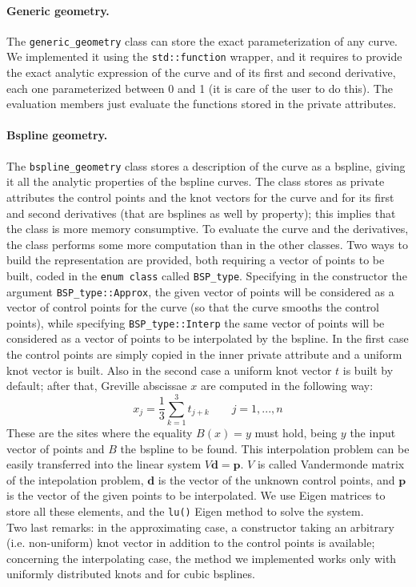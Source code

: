 \documentclass[10pt]{article} %
\newcommand{\classname}[1]{\texttt{#1}}
\begin{document}
	\paragraph{Generic geometry.} The \classname{generic\_geometry} class can store the exact parameterization of any curve. We implemented it using the \texttt{std::function} wrapper, and it requires to provide the exact analytic expression of the curve and of its first and second derivative, each one parameterized between 0 and 1 (it is care of the user to do this). The evaluation members just evaluate the functions stored in the private attributes.
	\paragraph{Bspline geometry.} The \classname{bspline\_geometry} class stores a description of the curve as a bspline, giving it all the analytic properties of the bspline curves. The class stores as private attributes the control points and the knot vectors for the curve and for its first and second derivatives (that are bsplines as well by property); this implies that the class is more memory consumptive. To evaluate the curve and the derivatives, the class performs some more computation than in the other classes. \newline	
	Two ways to build the representation are provided, both requiring a vector of points to be built, coded in the \texttt{enum class} called \texttt{BSP\_type}. Specifying in the constructor the argument \texttt{BSP\_type::Approx}, the given vector of points will be considered as a vector of control points for the curve (so that the curve smooths the control points), while specifying \texttt{BSP\_type::Interp} the same vector of points will be considered as a vector of points to be interpolated by the bspline. In the first case the control points are simply copied in the inner private attribute and a uniform knot vector is built. 
	Also in the second case a uniform knot vector $t$ is built by default; after that, Greville abscissae $x$ are computed in the following way: 
	\[x_{j} = \frac{1}{3} \sum_{k=1}^3 t_{j+k} \qquad j=1,...,n \]
	These are the sites where the equality $B(x)=y$ must hold, being $y$ the input vector of points and $B$ the bspline to be found.
	This interpolation problem can be easily transferred into the linear system $V \mathbf{d} = \mathbf{p}$. $V$ is called Vandermonde matrix of the intepolation problem, $\mathbf{d}$ is the vector of the unknown control points, and $\mathbf{p}$ is the vector of the given points to be interpolated. We use Eigen matrices to store all these elements, and the \texttt{lu()} Eigen method to solve the system. \\
	Two last remarks: in the approximating case, a constructor taking an arbitrary (i.e. non-uniform) knot vector in addition to the control points is available; concerning the interpolating case, the method we implemented works only with uniformly distributed knots and for cubic bsplines.
	
\end{document}
